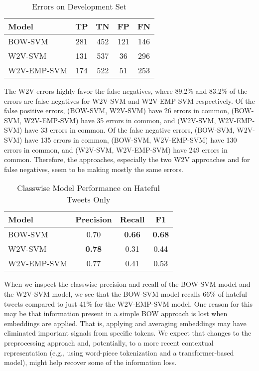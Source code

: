 \documentclass[11pt,a4paper]{article}
\begin{document}
\begin{table}[h]
\centering
\caption{Errors on Development Set}
\label{tab:errors}
\begin{tabular}{lcccc}
\hline
Model & TP & TN & FP & FN \\
\hline
BOW-SVM & 281 & 452 & 121 & 146 \\
W2V-SVM & 131 & 537 & 36 & 296 \\
W2V-EMP-SVM & 174 & 522 & 51 & 253 \\
\hline
\end{tabular}
\end{table}

The W2V errors highly favor the false negatives, where 89.2\% and 83.2\% of the errors are false negatives for W2V-SVM and W2V-EMP-SVM respectively. Of the false positive errors, (BOW-SVM, W2V-SVM) have 26 errors in common, (BOW-SVM, W2V-EMP-SVM) have 35 errors in common, and (W2V-SVM, W2V-EMP-SVM) have 33 errors in common. Of the false negative errors, (BOW-SVM, W2V-SVM) have 135 errors in common, (BOW-SVM, W2V-EMP-SVM) have 130 errors in common, and (W2V-SVM, W2V-EMP-SVM) have 249 errors in common. Therefore, the approaches, especially the two W2V approaches and for false negatives, seem to be making mostly the same errors.


\begin{table}[h]
\centering
\caption{Classwise Model Performance on Hateful Tweets Only}
\label{tab:model_performance}
\begin{tabular}{lccc}
\hline
Model & Precision & Recall & F1 \\
\hline
BOW-SVM & 0.70 & \textbf{0.66} & \textbf{0.68} \\
W2V-SVM & \textbf{0.78} & 0.31 & 0.44 \\
W2V-EMP-SVM & 0.77 & 0.41 & 0.53 \\
\hline
\end{tabular}
\end{table}

When we inspect the classwise precision and recall of the BOW-SVM model and the W2V-SVM model, we see that the BOW-SVM model recalls 66\% of hateful tweets compared to just 41\% for the W2V-EMP-SVM model. One reason for this may be that information present in a simple BOW approach is lost when embeddings are applied. That is, applying and averaging embeddings may have eliminated important signals from specific tokens. We expect that changes to the preprocessing approach and, potentially, to a more recent contextual representation (e.g., using word-piece tokenization and a transformer-based model), might help recover some of the information loss.
\end{document}
